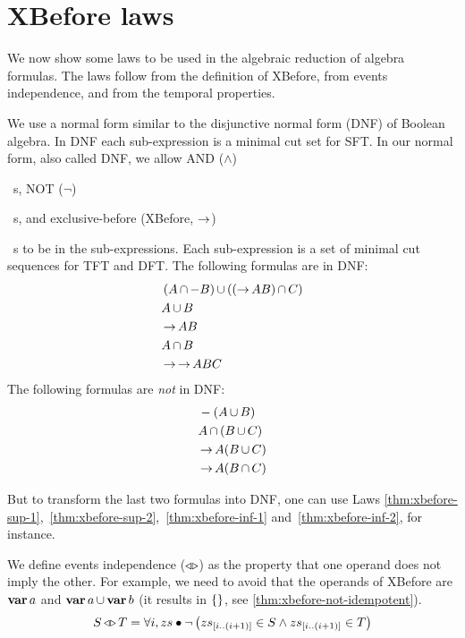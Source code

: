 \documentclass[en,twoside,onehalfspacing,phd]{risethesis}
\def\andtext{AND ($\land$)%
  \gdef\andtext{AND\xspace}%
  \xspace
}
\def\nottext{NOT ($\lnot$)%
  \gdef\nottext{NOT\xspace}%
  \xspace
}
\def\xbeforetext{exclusive-before (XBefore, $\xbefore$)%
  \gdef\xbeforetext{XBefore\xspace}%
  \xspace
}
\newcommand{\slice}[3]{\ensuremath #1_{\left[#2..#3\right]}}
\def\varop{\ensuremath\operatorname{\mathbf{var}}}
\newcommand{\var}[1]{\ensuremath\varop #1}
\def\xbeforeop{\ensuremath\rightarrow}
\newcommand{\xbefore}[2]{\ensuremath #1 \xbeforeop #2 }
\def\independenteventsop{\ensuremath\operatorname{\triangleleft\triangleright}}
\newcommand{\independentevents}[2]{\ensuremath #1 \independenteventsop #2}
\def\False{\ensuremath\operatorname{\left\{\right\}}}
\newcommand{\parsin}[1]{\ensuremath\left( #1 \right)}
\def\union{\ensuremath\operatorname{\cup}}
\def\inter{\ensuremath\operatorname{\cap}}
\def\xbefore{\ensuremath\operatorname{\rightarrow}}
\begin{document}
\section{XBefore laws}
\label{sec:xbefore-laws}

We now show some laws to be used in the algebraic reduction of \ac{algebra} formulas.
The laws follow from the definition of XBefore, from events independence, and from the temporal properties.

We use a normal form similar to the disjunctive normal form (DNF) of Boolean algebra.
In DNF each sub-expression is a minimal cut set for \ac{SFT}.
In our normal form, also called DNF, we allow \andtext\ s, \nottext\ s, and \xbeforetext\ s to be in the sub-expressions.
Each sub-expression is a set of minimal cut sequences for \ac{TFT} and \ac{DFT}.
The following formulas are in DNF:
%
\begin{align*}
&\parsin{A \inter -B} \union \parsin{\parsin{\xbefore{A}{B}} \inter C}\\
&A \union B\\
&\xbefore{A}{B}\\
&A \inter B\\
&\xbefore{\xbefore{A}{B}}{C}
\end{align*}
%
The following formulas are \emph{not} in DNF:
%
\begin{align*}
&-\parsin{A \union B}\\
&A \inter \parsin{B \union C}\\
&\xbefore{A}{\parsin{B \union C}}\\
&\xbefore{A}{\parsin{B \inter C}}
\end{align*}

But to transform the last two formulas into DNF, one can use Laws \eqref{thm:xbefore-sup-1},~\eqref{thm:xbefore-sup-2},~\eqref{thm:xbefore-inf-1} and~\eqref{thm:xbefore-inf-2}, for instance.

We define events independence ($\independenteventsop$) as the property that one operand does not imply the other.
For example, we need to avoid that the operands of XBefore are $\var{a}$ and $\var{a} \union \var{b}$ (it results in $\False$, see \eqref{thm:xbefore-not-idempotent}).
%
\begin{equation}
\independentevents{S}{T} = \forall i, zs \bullet
  \lnot \left(
    \slice{zs}{i}{\left(i+1\right)} \in S \land
    \slice{zs}{i}{\left(i+1\right)} \in T
  \right)
\end{equation}
\end{document}

